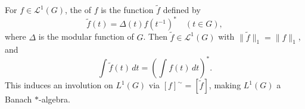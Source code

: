 \begin{definition}
For $f \in \mathcal{L}^1(G)$, the  of $f$ is the function $\tilde{f}$ defined by
$$\tilde{f}(t) = \Delta(t) f(t^{-1})^* \quad (t \in G),$$
where $\Delta$ is the modular function of $G$. Then $\tilde{f} \in \mathcal{L}^1(G)$ with $\|\tilde{f}\|_1 = \|f\|_1$, and
$$\int \tilde{f}(t)\, dt = \left( \int f(t)\, dt \right)^*.$$
This induces an involution on $L^1(G)$ via $[f]^{\sim} = [\tilde{f}]$, making $L^1(G)$ a Banach $*$-algebra.
\end{definition}

